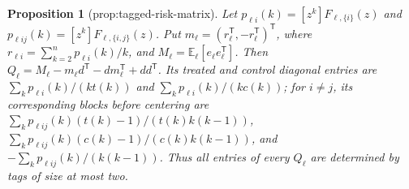 \documentclass{article}
\newtheorem{proposition}{Proposition}
\begin{document}
\begin{proposition}[prop:tagged-risk-matrix]\label{prop:tagged-risk-matrix}
Let \(p_{\ell i}(k)=[z^k]F_{\ell,\{i\}}(z)\) and \(p_{\ell ij}(k)=[z^k]F_{\ell,\{i,j\}}(z)\). Put \(m_{\ell}=(r_{\ell}^{\mathsf T},-r_{\ell}^{\mathsf T})^{\mathsf T}\), where \(r_{\ell i}=\sum_{k=2}^{n}p_{\ell i}(k)/k\), and \(M_{\ell}=\mathbb E_{\ell}[e_{\ell}e_{\ell}^{\mathsf T}]\). Then \(Q_{\ell}=M_{\ell}-m_{\ell}d^{\mathsf T}-dm_{\ell}^{\mathsf T}+dd^{\mathsf T}\). Its treated and control diagonal entries are \(\sum_kp_{\ell i}(k)/(kt(k))\) and \(\sum_kp_{\ell i}(k)/(kc(k))\); for \(i\ne j\), its corresponding blocks before centering are \(\sum_kp_{\ell ij}(k)(t(k)-1)/(t(k)k(k-1))\), \(\sum_kp_{\ell ij}(k)(c(k)-1)/(c(k)k(k-1))\), and \(-\sum_kp_{\ell ij}(k)/(k(k-1))\). Thus all entries of every \(Q_{\ell}\) are determined by tags of size at most two.
\end{proposition}
\end{document}
